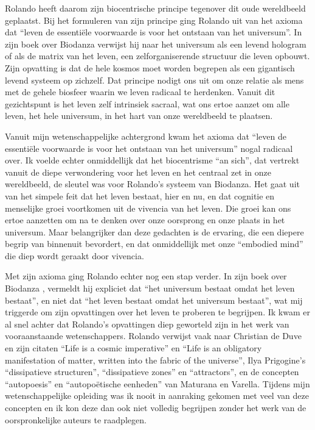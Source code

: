 \documentclass[
  11pt,
]{book}
\begin{document}
Rolando heeft daarom zijn biocentrische principe tegenover dit oude wereldbeeld geplaatst. Bij het formuleren van zijn principe ging Rolando uit van het axioma dat ``leven de essentiële voorwaarde is voor het ontstaan van het universum''. In zijn boek over Biodanza \citep{toro2008} verwijst hij naar het universum als een levend hologram of als de matrix van het leven, een zelforganiserende structuur die leven opbouwt. Zijn opvatting is dat de hele kosmos moet worden begrepen als een gigantisch levend systeem op zichzelf. Dat principe nodigt ons uit om onze relatie als mens met de gehele biosfeer waarin we leven radicaal te herdenken. Vanuit dit gezichtspunt is het leven zelf intrinsiek sacraal, wat ons ertoe aanzet om alle leven, het hele universum, in het hart van onze wereldbeeld te plaatsen.

Vanuit mijn wetenschappelijke achtergrond kwam het axioma dat ``leven de essentiële voorwaarde is voor het ontstaan van het universum'' nogal radicaal over. Ik voelde echter onmiddellijk dat het biocentrisme ``an sich'', dat vertrekt vanuit de diepe verwondering voor het leven en het centraal zet in onze wereldbeeld, de sleutel was voor Rolando's systeem van Biodanza. Het gaat uit van het simpele feit dat het leven bestaat, hier en nu, en dat cognitie en menselijke groei voortkomen uit de vivencia van het leven. Die groei kan ons ertoe aanzetten om na te denken over onze oorsprong en onze plaats in het universum. Maar belangrijker dan deze gedachten is de ervaring, die een diepere begrip van binnenuit bevordert, en dat onmiddellijk met onze ``embodied mind'' die diep wordt geraakt door vivencia.

Met zijn axioma ging Rolando echter nog een stap verder. In zijn boek over Biodanza \citep{toro2008}, vermeldt hij expliciet dat ``het universum bestaat omdat het leven bestaat'', en niet dat ``het leven bestaat omdat het universum bestaat'', wat mij triggerde om zijn opvattingen over het leven te proberen te begrijpen. Ik kwam er al snel achter dat Rolando's opvattingen diep geworteld zijn in het werk van vooraanstaande wetenschappers. Rolando verwijst vaak naar Christian de Duve en zijn citaten ``Life is a cosmic imperative'' en ``Life is an obligatory manifestation of matter, written into the fabric of the universe'', Ilya Prigogine's ``dissipatieve structuren'', ``dissipatieve zones'' en ``attractors'', en de concepten ``autopoesis'' en ``autopoëtische eenheden'' van Maturana en Varella. Tijdens mijn wetenschappelijke opleiding was ik nooit in aanraking gekomen met veel van deze concepten en ik kon deze dan ook niet volledig begrijpen zonder het werk van de oorspronkelijke auteurs te raadplegen.
\end{document}
